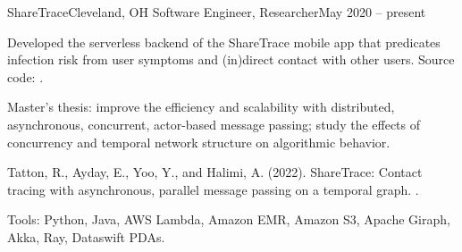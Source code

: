 \begin{ritemize}
{ShareTrace}{Cleveland, OH}
{Software Engineer, Researcher}{May 2020 -- present}
	\item Developed the serverless backend of the ShareTrace mobile app that predicates infection risk from user symptoms and (in)direct contact with other users. Source code: .
	\item Master's thesis: improve the efficiency and scalability with distributed, asynchronous, concurrent, actor-based message passing; study the effects of concurrency and temporal network structure on algorithmic behavior.
	\item Tatton, R., Ayday, E., Yoo, Y., and Halimi, A. (2022). ShareTrace: Contact tracing with asynchronous, parallel message passing on a temporal graph.
	 .
	\item Tools: Python, Java, AWS Lambda, Amazon EMR, Amazon S3, Apache Giraph, Akka, Ray, Dataswift PDAs.
\end{ritemize}